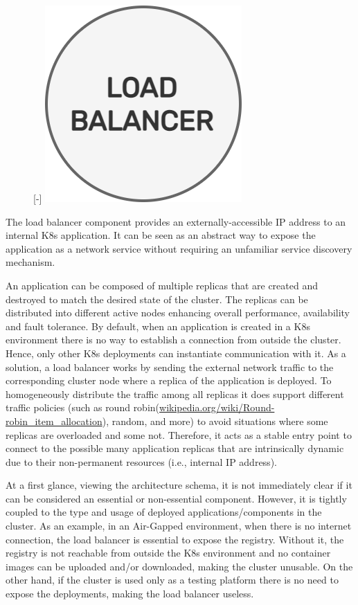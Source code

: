 \begin{figure} %
  \raisebox{0pt}[\dimexpr\height-\baselineskip\relax]{\centering
  \includegraphics[width=.2\textwidth]{images/recluster/load_balancer.png}}
\end{figure}

The load balancer component provides an externally-accessible IP address to an
internal K8s application. It can be seen as an abstract way to expose the application
as a network service without requiring an unfamiliar service discovery mechanism\cite{https://kubernetes.io/docs/concepts/services-networking/service}.

An application can be composed of multiple replicas that are created and
destroyed to match the desired state of the cluster. The replicas can be distributed
into different active nodes enhancing overall performance, availability and
fault tolerance. By default, when an application is created in a K8s environment
there is no way to establish a connection from outside the cluster. Hence, only
other K8s deployments can instantiate communication with it. As a solution, a
load balancer works by sending the external network traffic to the corresponding
cluster node where a replica of the application is deployed. To homogeneously distribute
the traffic among all replicas it does support different traffic policies (such
as round robin(\url{wikipedia.org/wiki/Round-robin_item_allocation}), random, and
more) to avoid situations where some replicas are overloaded and some not. Therefore,
it acts as a stable entry point to connect to the possible many application
replicas that are intrinsically dynamic due to their non-permanent resources (i.e.,
internal IP address).

At a first glance, viewing the architecture schema, it is not immediately clear
if it can be considered an essential or non-essential component. However, it is
tightly coupled to the type and usage of deployed applications/components in the
cluster. As an example, in an Air-Gapped environment, when there is no internet connection,
the load balancer is essential to expose the registry. Without it, the registry
is not reachable from outside the K8s environment and no container images can be
uploaded and/or downloaded, making the cluster unusable. On the other hand, if the
cluster is used only as a testing platform there is no need to expose the deployments,
making the load balancer useless.

